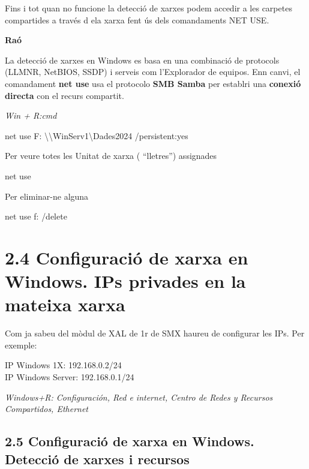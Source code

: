\documentclass[
  a4paper,
]{article}
\newenvironment{Shaded}{\begin{snugshade}}{\end{snugshade}}
\newcommand{\AttributeTok}[1]{\textcolor[rgb]{0.13,0.29,0.53}{#1}}
\newcommand{\NormalTok}[1]{#1}
\begin{document}
Fins i tot quan no funcione la detecció de xarxes podem accedir a les
carpetes compartides a través d ela xarxa fent ús dels comandaments NET
USE.

\textbf{Raó}

La detecció de xarxes en Windows es basa en una combinació de protocols
(LLMNR, NetBIOS, SSDP) i serveis com l'Explorador de equipos. Enn canvi,
el comandament \textbf{net use} usa el protocolo \textbf{SMB Samba} per
establri una \textbf{conexió directa} con el recurs compartit.

\emph{Win + R:cmd}

\begin{Shaded}
\begin{Highlighting}[]
\NormalTok{net use F: \textbackslash{}\textbackslash{}WinServ1\textbackslash{}Dades2024 }\AttributeTok{/persistent:}\NormalTok{yes}
\end{Highlighting}
\end{Shaded}

Per veure totes les Unitat de xarxa ( ``lletres'') assignades

\begin{Shaded}
\begin{Highlighting}[]
\NormalTok{net use}
\end{Highlighting}
\end{Shaded}

Per eliminar-ne alguna

\begin{Shaded}
\begin{Highlighting}[]
\NormalTok{net use f: }\AttributeTok{/delete}
\end{Highlighting}
\end{Shaded}

\section{2.4 Configuració de xarxa en Windows. IPs privades en la
mateixa
xarxa}\label{configuraciuxf3-de-xarxa-en-windows.-ips-privades-en-la-mateixa-xarxa}

Com ja sabeu del mòdul de XAL de 1r de SMX haureu de configurar les IPs.
Per exemple:

IP Windows 1X: 192.168.0.2/24\\
IP Windows Server: 192.168.0.1/24

\emph{Windows+R: Configuración, Red e internet, Centro de Redes y
Recursos Compartidos, Ethernet}

\subsection{2.5 Configuració de xarxa en Windows. Detecció de xarxes i
recursos}\label{configuraciuxf3-de-xarxa-en-windows.-detecciuxf3-de-xarxes-i-recursos}
\end{document}
